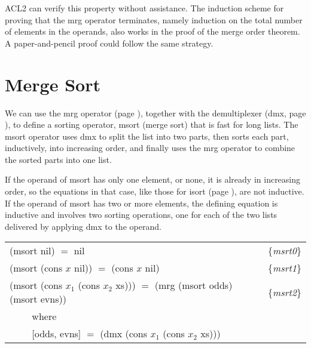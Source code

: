 ACL2 can verify this property without assistance.
The induction scheme for proving that
the \textsf{mrg} operator terminates,
namely induction on the total number of elements in the operands,
also works in the proof of the merge order theorem.
A paper-and-pencil proof could follow the same strategy.

\begin{exercises}




\end{exercises}

\section{Merge Sort}
\label{sec:msort}

We can use the \textsf{mrg} operator (page \pageref{defun:mrg}),
together with the demultiplexer (\textsf{dmx}, page \pageref{dmx-defun}),
to define a sorting operator, \textsf{msort} (merge sort) that is fast for long lists.
The \textsf{msort} operator uses \textsf{dmx} to split the list into two parts,
then sorts each part, inductively, into increasing order, and finally
uses the \textsf{mrg} operator to combine the sorted parts into one list.

If the operand of \textsf{msort} has only one element, or none,
it is already in increasing order,
so the equations in that case,
like those for \textsf{isort} (page \pageref{eq:isrt0}),
are not inductive.
If the operand of \textsf{msort} has two or more elements,
the defining equation is inductive and
involves two sorting operations,
one for each of the two lists delivered by applying
\textsf{dmx} to the operand.

\begin{center}
\label{eq:msrt1}
\label{eq:msrt0}
\label{eq:msrt2}
\begin{tabular}{ll}
\textsf{(msort nil) $=$ nil}                        & \{\emph{msrt0}\} \\
\textsf{(msort (cons $x$ nil)) $=$ (cons $x$ nil)} & \{\emph{msrt1}\} \\
\textsf{(msort (cons $x_1$ (cons $x_2$ xs))) $=$ (mrg (msort odds) (msort evns))} & \{\emph{msrt2}\} \\
 ~~~~ where  & \\
 ~~~~ \textsf{[odds, evns] $=$ (dmx (cons $x_1$ (cons $x_2$ xs)))} & \\
\end{tabular}
\end{center}

